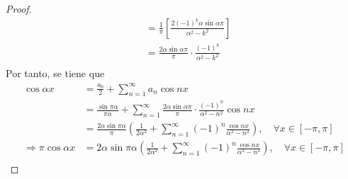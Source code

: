 \documentclass[12pt]{report}
\newcounter{it}
\theoremstyle{largebreak}
\begin{document}
\begin{proof}
\begin{equation*}
\begin{split}
                &=\frac{1}{\pi}\left[\frac{2(-1)^k\alpha\sin\alpha\pi}{\alpha^2-k^2}\right]\\
                &=\frac{2\alpha\sin\alpha\pi}{\pi}\cdot\frac{(-1)^k}{\alpha^2-k^2}\\
            \end{split}
        \end{equation*}
        Por tanto, se tiene que
        \begin{equation*}
            \begin{split}
                \cos\alpha x&=\frac{a_0}{2}+\sum_{n=1}^{\infty}a_n\cos nx\\
                &=\frac{\sin \pi\alpha}{\pi\alpha}+\sum_{n=1}^{\infty} \frac{2\alpha\sin\alpha\pi}{\pi}\cdot\frac{(-1)^n}{\alpha^2-n^2}\cos nx\\
                &=\frac{2\alpha\sin\pi\alpha}{\pi}\left(\frac{1}{2\alpha^2}+\sum_{n=1}^{\infty}(-1)^n\frac{\cos nx}{\alpha^2-n^2}\right),\quad\forall x\in[-\pi,\pi]\\
                \Rightarrow \pi\cos \alpha x&=2\alpha\sin\pi\alpha\left(\frac{1}{2\alpha^2}+\sum_{n=1}^{\infty}(-1)^n\frac{\cos nx}{\alpha^2-n^2}\right),\quad\forall x\in[-\pi,\pi] \\
            \end{split}
        \end{equation*}
        

\end{proof}
\end{document}
